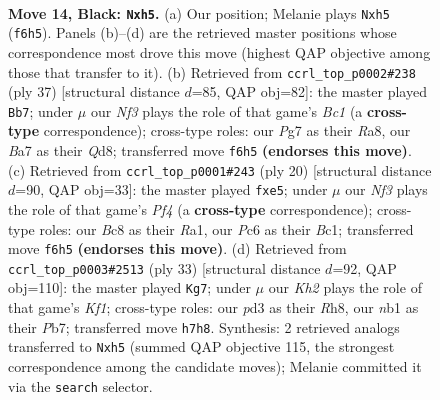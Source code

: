 \documentclass[11pt]{article}
\begin{document}
\clearpage

\begin{figure}[p]\centering
\begin{subfigure}{0.46\textwidth}\centering
\resizebox{\linewidth}{!}{%
\newchessgame
\chessboard[
  setfen={r1bq1r2/b1p2ppk/2pp1n1p/P3p2P/4P3/2PP1N2/5PP1/RNBQ1RK1 b - - 0 14},
  showmover=false,
  pgfstyle=straightmove, color=movearrow, markmove={f6-h5}
]}
\caption{}
\end{subfigure}\hfill
\begin{subfigure}{0.46\textwidth}\centering
\resizebox{\linewidth}{!}{%
\newchessgame
\chessboard[
  setfen={r1bqr1k1/5pp1/1pp2n1p/p7/P2Pp3/1PN1P2P/2QN1PP1/R1R3K1 b - - 0 19},
  showmover=false,
  pgfstyle=straightmove, color=movearrow, markmove={c8-b7}
]}
\caption{}
\end{subfigure}
\\[4pt]
\begin{subfigure}{0.46\textwidth}\centering
\resizebox{\linewidth}{!}{%
\newchessgame
\chessboard[
  setfen={rnbq1rk1/pp3p1p/5np1/2pPp3/5P2/2P2N2/P5PP/R1BQKB1R w KQ - 0 11},
  showmover=false,
  pgfstyle=straightmove, color=movearrow, markmove={f4-e5}
]}
\caption{}
\end{subfigure}\hfill
\begin{subfigure}{0.46\textwidth}\centering
\resizebox{\linewidth}{!}{%
\newchessgame
\chessboard[
  setfen={r2q1k1r/1p3p2/p1npbnp1/4p3/2P1P1P1/2N2P1p/PPNQ3P/2KR1B1R b - - 0 17},
  showmover=false,
  pgfstyle=straightmove, color=movearrow, markmove={f8-g7}
]}
\caption{}
\end{subfigure}
\caption{\textbf{Move 14, Black: \texttt{Nxh5}.} (a) Our position; Melanie plays \texttt{Nxh5} (\texttt{f6h5}). Panels (b)--(d) are the retrieved master positions whose correspondence most drove this move (highest QAP objective among those that transfer to it). (b) Retrieved from \texttt{ccrl\_top\_p0002\#238} (ply 37) [structural distance $d$=85, QAP obj=82]: the master played \texttt{Bb7}; under $\mu$ our \emph{Nf3} plays the role of that game's \emph{Bc1} (a \textbf{cross-type} correspondence); cross-type roles: our \emph{P}g7 as their \emph{R}a8, our \emph{B}a7 as their \emph{Q}d8; transferred move \texttt{f6h5} \textbf{(endorses this move)}. (c) Retrieved from \texttt{ccrl\_top\_p0001\#243} (ply 20) [structural distance $d$=90, QAP obj=33]: the master played \texttt{fxe5}; under $\mu$ our \emph{Nf3} plays the role of that game's \emph{Pf4} (a \textbf{cross-type} correspondence); cross-type roles: our \emph{B}c8 as their \emph{R}a1, our \emph{P}c6 as their \emph{B}c1; transferred move \texttt{f6h5} \textbf{(endorses this move)}. (d) Retrieved from \texttt{ccrl\_top\_p0003\#2513} (ply 33) [structural distance $d$=92, QAP obj=110]: the master played \texttt{Kg7}; under $\mu$ our \emph{Kh2} plays the role of that game's \emph{Kf1}; cross-type roles: our \emph{p}d3 as their \emph{R}h8, our \emph{n}b1 as their \emph{P}b7; transferred move \texttt{h7h8}. Synthesis: 2 retrieved analogs transferred to \texttt{Nxh5} (summed QAP objective 115, the strongest correspondence among the candidate moves); Melanie committed it via the \texttt{search} selector.}
\label{fig:thought-m27}
\end{figure}
\end{document}
